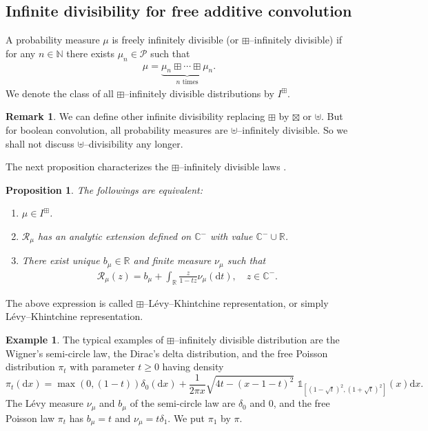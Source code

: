 \documentclass[12pt]{amsart}
\newtheorem{prop}[thm]{Proposition}
\theoremstyle{definition}
\newtheorem{rem}[thm]{Remark}
\newtheorem{exa}[thm]{Example}
\numberwithin{equation}{section}
\begin{document}
\subsection{Infinite divisibility for free additive convolution}
A probability measure $\mu$ is freely infinitely divisible (or $\boxplus$--infinitely divisible) if 
for any $n\in{\mathbb{N}}$ there exists $\mu_n\in\mathcal{P}$ such that
	\begin{align*}
	\mu = 
	\underbrace{\mu_n \boxplus\cdots \boxplus\mu_n}_{n \text{ times}}.
	\end{align*}
We denote the class of all $\boxplus$--infinitely divisible distributions by $I^{\boxplus}$.
	\begin{rem}
	We can define other infinite divisibility replacing $\boxplus$ 
	by $\boxtimes$ or $\uplus$.
	But for boolean convolution, all probability measures are 
	$\uplus$--infinitely divisible. 
	So we shall not discuss $\uplus$--divisibility any longer.
	\end{rem}
The next proposition characterizes the $\boxplus$--infinitely divisible laws \cite[Theorem3.7.2]{VoDyNi92}. 
\begin{prop}\label{id}
	The followings are equivalent:
		\begin{enumerate}[{\rm (1)}]
		\item $\mu \in I^{\boxplus}$.
		\item $\mathcal{R}_{\mu}$ has an analytic extension defined on ${\mathbb{C}}^-$ with value ${\mathbb{C}}^- \cup {\mathbb{R}}$.
		\item There exist unique $b_{\mu}\in{\mathbb{R}}$ 
		and finite measure $\nu_{\mu}$
		such that
			\begin{align*}
			\mathcal{R}_{\mu}(z) 
			= b_{\mu} + \int_{\mathbb{R}} \frac{z}{1-tz}\nu_{\mu}({\mathrm d}t),
			\quad z \in {\mathbb{C}}^-.
			\end{align*}
		\end{enumerate}
\end{prop}
The above expression is called $\boxplus$--L\'evy--Khintchine representation, 
or simply L\'evy--Khintchine representation.

	\begin{exa}The
	typical examples of $\boxplus$--infinitely divisible distribution are
	the Wigner's semi-circle law, the Dirac's delta distribution, and
	the free Poisson distribution $\pi_t$ with parameter $t\geq0$  
	having density
	\begin{equation}
	\pi_{t}(\mathrm{d}x)
	=\max(0,(1-t))\delta_{0}(\mathrm{d}x)
	+\frac{1}{2\pi x}\sqrt{4t-(x-1-t)^{2}}\,\,\mathbb{1}
	_{[(1-\sqrt{t})^{2},(1+\sqrt{t})^{2}]}(x)\mathrm{d}x.  \label{MaPadis}
	\end{equation}
	The L\'evy measure $\nu_{\mu}$ and $b_{\mu}$ 
	of the semi-circle law are $\delta_{0}$ and $0$,
	and the free Poisson law $\pi_t$ has $b_{\mu}=t$ and 
    $\nu_{\mu}=t \delta_{1}$.
	We put $\pi_{1}$ by $\pi$.
	\end{exa}
\end{document}
